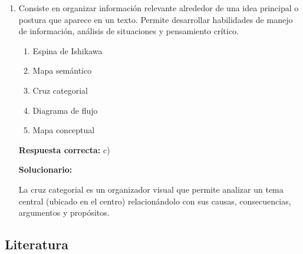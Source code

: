 \begin{enumerate}[resume]
	\vspace{2mm}
	\textbf{Solucionario:}

	El enunciado tiene una función informativa o referencial; busca definir o explicar qué es la telenovela dentro del contexto televisivo.

	\vspace{6mm}

	\item Consiste en organizar información relevante alrededor de una idea principal o postura que aparece en un texto. Permite desarrollar habilidades de manejo de información, análisis de situaciones y pensamiento crítico.
	\begin{enumerate}[label=\alph*)]
		\item Espina de Ishikawa
		\item Mapa semántico
		\item Cruz categorial
		\item Diagrama de flujo
		\item Mapa conceptual
	\end{enumerate}
	\textbf{Respuesta correcta:} c)

	\vspace{2mm}
	\textbf{Solucionario:}

	La cruz categorial es un organizador visual que permite analizar un tema central (ubicado en el centro) relacionándolo con sus causas, consecuencias, argumentos y propósitos.

	\vspace{6mm}
\end{enumerate}

\subsection*{Literatura}

